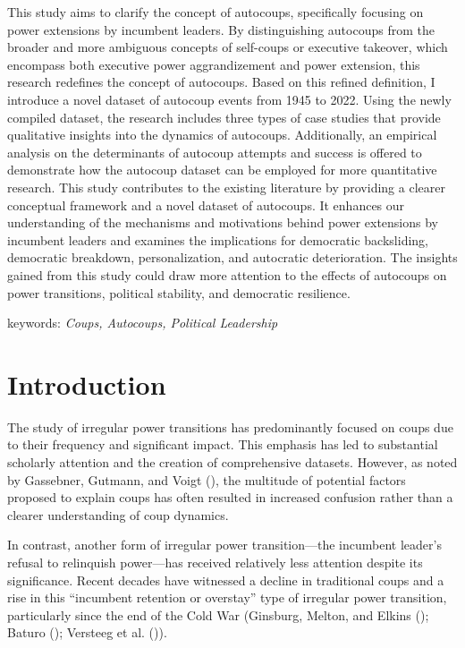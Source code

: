 \documentclass[
  12pt,
]{report}
\begin{document}
This study aims to clarify the concept of autocoups, specifically
focusing on power extensions by incumbent leaders. By distinguishing
autocoups from the broader and more ambiguous concepts of self-coups or
executive takeover, which encompass both executive power aggrandizement
and power extension, this research redefines the concept of autocoups.
Based on this refined definition, I introduce a novel dataset of
autocoup events from 1945 to 2022. Using the newly compiled dataset, the
research includes three types of case studies that provide qualitative
insights into the dynamics of autocoups. Additionally, an empirical
analysis on the determinants of autocoup attempts and success is offered
to demonstrate how the autocoup dataset can be employed for more
quantitative research. This study contributes to the existing literature
by providing a clearer conceptual framework and a novel dataset of
autocoups. It enhances our understanding of the mechanisms and
motivations behind power extensions by incumbent leaders and examines
the implications for democratic backsliding, democratic breakdown,
personalization, and autocratic deterioration. The insights gained from
this study could draw more attention to the effects of autocoups on
power transitions, political stability, and democratic resilience.

keywords: \emph{Coups, Autocoups, Political Leadership}

\newpage

\section{Introduction}\label{introduction-2}

The study of irregular power transitions has predominantly focused on
coups due to their frequency and significant impact. This emphasis has
led to substantial scholarly attention and the creation of comprehensive
datasets. However, as noted by Gassebner, Gutmann, and Voigt
(), the multitude of potential factors
proposed to explain coups has often resulted in increased confusion
rather than a clearer understanding of coup dynamics.

In contrast, another form of irregular power transition---the incumbent
leader's refusal to relinquish power---has received relatively less
attention despite its significance. Recent decades have witnessed a
decline in traditional coups and a rise in this ``incumbent retention or
overstay'' type of irregular power transition, particularly since the
end of the Cold War (Ginsburg, Melton, and Elkins
(); Baturo
(); Versteeg et al.
()).
\end{document}
